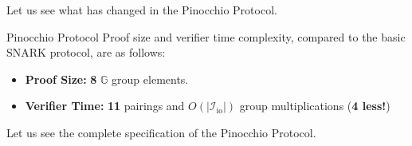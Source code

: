 \documentclass[../lecture-notes.tex]{subfiles}
\begin{document}
Let us see what has changed in the Pinocchio Protocol.

\begin{proposition}{Pinocchio Protocol}
    Proof size and verifier time complexity, compared to the basic SNARK protocol, are as follows:
    \begin{itemize}
        \item \textbf{Proof Size:} \textbf{8} $\mathbb{G}$ group elements.
        \item \textbf{Verifier Time:} \textbf{11} pairings and $O(|\mathcal{I}_{\text{io}}|)$ group multiplications (\textbf{4 less!})
    \end{itemize}
\end{proposition}

Let us see the complete specification of the Pinocchio Protocol.
\end{document}
